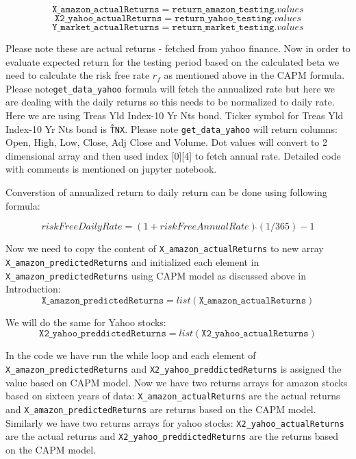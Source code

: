 \indent

$$\texttt{X\_amazon\_actualReturns} = \texttt{return\_amazon\_testing}.values$$
$$\texttt{X2\_yahoo\_actualReturns} = \texttt{return\_yahoo\_testing}.values$$
$$\texttt{Y\_market\_actualReturns} = \texttt{return\_market\_testing}.values$$

\indent

Please note these are actual returns - fetched from yahoo finance. Now in order to evaluate expected return for the testing period based on the calculated beta we need 
to calculate the risk free rate $r_{f}$ as mentioned above in the CAPM formula. Please note\texttt{get\_data\_yahoo} formula will fetch the annualized rate but here we are dealing 
with the daily returns so this needs to be normalized to daily rate. Here we are using Treas Yld Index-10 Yr Nts bond. Ticker symbol for Treas Yld Index-10 Yr Nts bond
is \texttt{\^TNX}. Please note \texttt{get\_data\_yahoo} will return columns: Open, High, Low, Close, Adj Close and Volume. Dot values will convert to 2 dimensional array 
and then used index [0][4] to fetch annual rate. Detailed code with comments is mentioned on jupyter notebook. 

Converstion of annualized return to daily return can be done using following formula:

\indent
$$riskFreeDailyRate = (1+riskFreeAnnualRate) \hat{} (1/365) -1 $$
\indent 

Now we need to copy the content of \texttt{X\_amazon\_actualReturns} to new array \texttt{X\_amazon\_predictedReturns} and initialized each element in \texttt{X\_amazon\_predictedReturns} using 
CAPM model as discussed above in Introduction:
\indent
$$\texttt{X\_amazon\_predictedReturns} = list(\texttt{X\_amazon\_actualReturns})$$

\indent 
We will do the same for Yahoo stocks:
\indent 
$$\texttt{X2\_yahoo\_preddictedReturns} = list(\texttt{X2\_yahoo\_actualReturns})$$
\indent 


In the code we have run the while loop and each element of \texttt{X\_amazon\_predictedReturns} and \texttt{X2\_yahoo\_preddictedReturns} is assigned the value
based on CAPM model. Now we have two returns arrays for amazon stocks based on sixteen years of data: 
\texttt{X\_amazon\_actualReturns} are the actual returns and 
\texttt{X\_amazon\_predictedReturns} are returns based on the CAPM model. Similarly we have two returns arrays for yahoo stocks: \texttt{X2\_yahoo\_actualReturns} are
the actual returns and \texttt{X2\_yahoo\_preddictedReturns} are the returns based on the CAPM model. 

